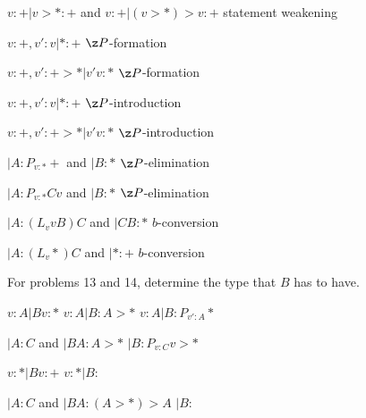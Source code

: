 $ v:+ | v>*:+ $ and $ v:+ | (v>*)>v:+ $
statement weakening
        \answer
        $  $
        \endanswer

$ v:+ , v':v | *:+ $
$\z P$-formation
        \answer
        $  $
        \endanswer

$ v:+ , v':+>* | v'v:* $
$\z P$-formation
        \answer
        $  $
        \endanswer

$ v:+ , v':v | *:+ $
$\z P$-introduction
        \answer
        $  $
        \endanswer

$ v:+ , v':+>* | v'v:* $
$\z P$-introduction
        \answer
        $  $
        \endanswer

$ | A:P_{v:*}+ $ and $ | B:* $
$\z P$-elimination
        \answer
        $  $
        \endanswer

$ | A:P_{v:*}Cv $ and $ | B:* $
$\z P$-elimination
        \answer
        $  $
        \endanswer

$ | A:(L_vvB)C $ and $ | CB:* $
$ b$-conversion
        \answer
        $  $
        \endanswer

$ | A:(L_v*)C $ and $ | *:+ $
$ b$-conversion
        \answer
        $  $
        \endanswer

\endproblems

For problems 13 and 14, determine the type that $B$ has to have.

\problems
{}
$ v:A | Bv:* $
        \answer
        $ v:A | B:A>* $  \OR  $ v:A | B:P_{v':A}* $
        \endanswer

\problem{\gobble}
$ | A:C $ and $ | BA:A>* $
        \answer
        $ | B:P_{v:C}v>* $
        \endanswer

$ v:* | Bv:+ $
	\answer
	$ v:* | B: $
	\endanswer

$ | A:C $ and $ | BA:(A>*)>A $
	\answer
	$ | B: $
	\endanswer

\endproblems
\bye
